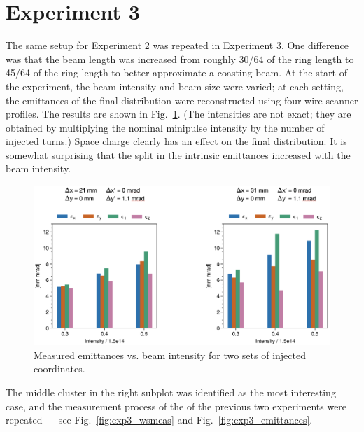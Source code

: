 \section{Experiment 3}

The same setup for Experiment 2 was repeated in Experiment 3. One difference was that the beam length was increased from roughly 30/64 of the ring length to 45/64 of the ring length to better approximate a coasting beam. At the start of the experiment, the beam intensity and beam size were varied; at each setting, the emittances of the final distribution were reconstructed using four wire-scanner profiles. The results are shown in Fig.~\ref{fig:exp3_search}. (The intensities are not exact; they are obtained by multiplying the nominal minipulse intensity by the number of injected turns.) Space charge clearly has an effect on the final distribution. It is somewhat surprising that the split in the intrinsic emittances increased with the beam intensity. 
%
\begin{figure}[!p]
    \centering
    \vspace*{1.0cm}
    \includegraphics[width=\textwidth]{Images/chapter5/exp3/search.png}
    \caption{Measured emittances vs. beam intensity for two sets of injected coordinates.}
    \label{fig:exp3_search}
    \vspace*{1.0cm}
\end{figure}
%
The middle cluster in the right subplot was identified as the most interesting case, and the measurement process of the  of the previous two experiments were repeated — see Fig.~\ref{fig:exp3_wsmeas} and Fig.~\ref{fig:exp3_emittances}.
%

